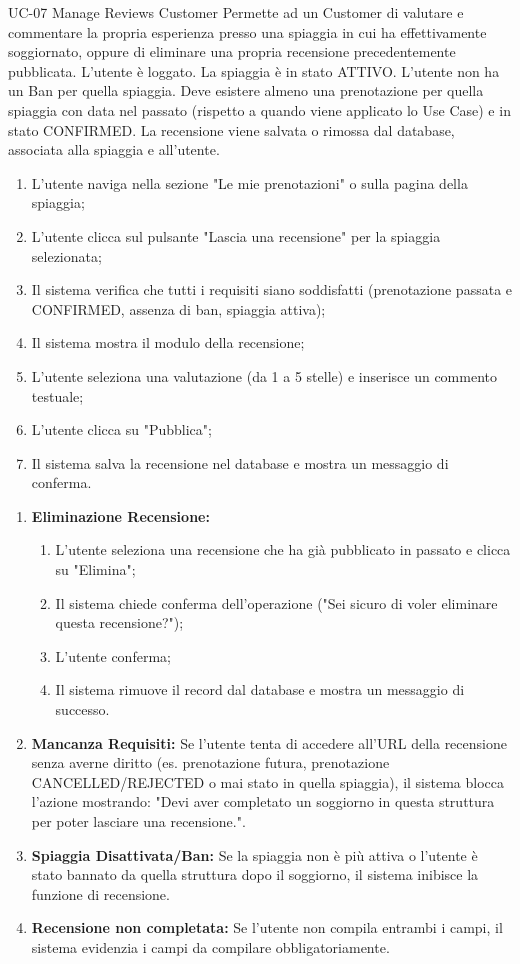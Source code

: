\usecasetable
{UC-07}
{Manage Reviews}
{Customer}
{Permette ad un Customer di valutare e commentare la propria esperienza presso una spiaggia in cui ha effettivamente soggiornato, oppure di eliminare una propria recensione precedentemente pubblicata.}
{L'utente è loggato. La spiaggia è in stato ATTIVO. L'utente non ha un Ban per quella spiaggia. Deve esistere almeno una prenotazione per quella spiaggia con data nel passato (rispetto a quando viene applicato lo Use Case) e in stato CONFIRMED.}
{La recensione viene salvata o rimossa dal database, associata alla spiaggia e all'utente.}
{
	\begin{enumerate}[nosep, leftmargin=*]
		\item L'utente naviga nella sezione "Le mie prenotazioni" o sulla pagina della spiaggia;
		\item L'utente clicca sul pulsante "Lascia una recensione" per la spiaggia selezionata;
		\item Il sistema verifica che tutti i requisiti siano soddisfatti (prenotazione passata e CONFIRMED, assenza di ban, spiaggia attiva);
		\item Il sistema mostra il modulo della recensione;
		\item L'utente seleziona una valutazione (da 1 a 5 stelle) e inserisce un commento testuale;
		\item L'utente clicca su "Pubblica";
		\item Il sistema salva la recensione nel database e mostra un messaggio di conferma.
	\end{enumerate}
}
{
	\begin{enumerate}[nosep, leftmargin=25px]
		\item[\textbf{2a.}] \textbf{Eliminazione Recensione:} 
		\begin{enumerate}[nosep, leftmargin=*]
			\item[i.] L'utente seleziona una recensione che ha già pubblicato in passato e clicca su "Elimina";
			\item[ii.] Il sistema chiede conferma dell'operazione ("Sei sicuro di voler eliminare questa recensione?");
			\item[iii.] L'utente conferma;
			\item[iv.] Il sistema rimuove il record dal database e mostra un messaggio di successo.
		\end{enumerate}
		\item[\textbf{3a-e.}] \textbf{Mancanza Requisiti:} Se l'utente tenta di accedere all'URL della recensione senza averne diritto (es. prenotazione futura, prenotazione CANCELLED/REJECTED o mai stato in quella spiaggia), il sistema blocca l'azione mostrando: "Devi aver completato un soggiorno in questa struttura per poter lasciare una recensione.".
		\item[\textbf{3b-e.}] \textbf{Spiaggia Disattivata/Ban:} Se la spiaggia non è più attiva o l'utente è stato bannato da quella struttura dopo il soggiorno, il sistema inibisce la funzione di recensione.
		\item[\textbf{6a-e.}] \textbf{Recensione non completata:} Se l'utente non compila entrambi i campi, il sistema evidenzia i campi da compilare obbligatoriamente.
	\end{enumerate}
}
